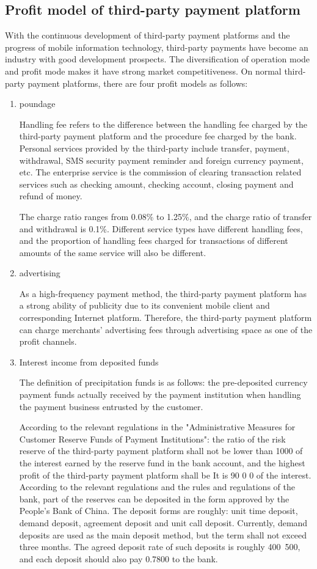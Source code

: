 \documentclass[../mcmpaper]{subfiles}
\begin{document}
\subsection{Profit model of third-party payment platform}
With the continuous development of third-party payment platforms and the progress of mobile information technology, third-party payments have become an industry with good development prospects. The diversification of operation mode and profit mode makes it have strong market competitiveness. On normal third-party payment platforms, there are four profit models as follows:
\begin{enumerate}[label=\arabic*), itemindent=2\parindent, leftmargin=0pt, topsep=0pt, listparindent=\parindent, itemsep=1pt]
	\item poundage\par
Handling fee refers to the difference between the handling fee charged by the third-party payment platform and the procedure fee charged by the bank. Personal services provided by the third-party include transfer, payment, withdrawal, SMS security payment reminder and foreign currency payment, etc. The enterprise service is the commission of clearing transaction related services such as checking amount, checking account, closing payment and refund of money.
\par
The charge ratio ranges from 0.08\% to 1.25\%, and the charge ratio of transfer and withdrawal is 0.1\%. Different service types have different handling fees, and the proportion of handling fees charged for transactions of different amounts of the same service will also be different.
	\item advertising\par
As a high-frequency payment method, the third-party payment platform has a strong ability of publicity due to its convenient mobile client and corresponding Internet platform. Therefore, the third-party payment platform can charge merchants' advertising fees through advertising space as one of the profit channels.
	\item Interest income from deposited funds\par
The definition of precipitation funds is as follows: the pre-deposited currency payment funds actually received by the payment institution when handling the payment business entrusted by the customer.
\par
According to the relevant regulations in the "Administrative Measures for Customer Reserve Funds of Payment Institutions": the ratio of the risk reserve of the third-party payment platform shall not be lower than 1000 of the interest earned by the reserve fund in the bank account, and the highest profit of the third-party payment platform shall be It is 90 0 0 of the interest. According to the relevant regulations and the rules and regulations of the bank, part of the reserves can be deposited in the form approved by the People's Bank of China. The deposit forms are roughly: unit time deposit, demand deposit, agreement deposit and unit call deposit. Currently, demand deposits are used as the main deposit method, but the term shall not exceed three months. The agreed deposit rate of such deposits is roughly 400~500, and each deposit should also pay 0.7800 to the bank.

\end{enumerate}
\end{document}
